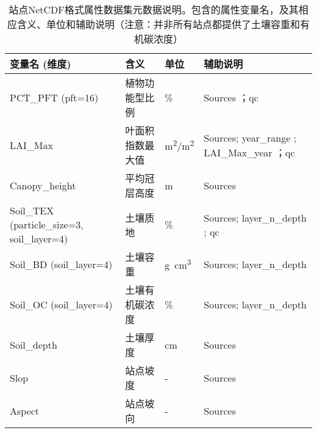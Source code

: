 \begin{table}[htbp]
  \begin{threeparttable}
    \centering
    \caption[站点NetCDF格式属性数据集元数据说明]{站点NetCDF格式属性数据集元数据说明。包含的属性变量名，及其相应含义、单位和辅助说明（注意：并非所有站点都提供了土壤容重和有机碳浓度）}
    \label{tab:站点数据元数据}
    \begin{tabular}{p{9.75em}p{10.25em}p{3.5em}p{9.5em}}
      \toprule
      \textbf{变量名 (维度)}                               & \textbf{含义}             & \textbf{单位}  & \textbf{辅助说明}                                            \\
      \midrule
      PCT\_PFT (pft=16)                                    & 植物功能型比例            & \%             & Sources\tnote{a} ；qc                                        \\
      LAI\_Max                                             & 叶面积指数最大值          & \unit{m^2/m^2} & Sources; year\_range\tnote{b} ; LAI\_Max\_year\tnote{c} ；qc \\
      Canopy\_height                                       & 平均冠层高度              & m              & Sources                                                      \\
      Soil\_TEX \newline (particle\_size=3, soil\_layer=4) & 土壤质地                  & \%             & Sources; layer\_n\_depth\tnote{d} ; qc                       \\
      Soil\_BD (soil\_layer=4)                             & 土壤容重                  & \unit{g.cm^3}  & Sources; layer\_n\_depth                                     \\
      Soil\_OC (soil\_layer=4)                             & 土壤有机碳浓度            & \%             & Sources; layer\_n\_depth                                     \\
      Soil\_depth                                          & 土壤厚度                  & cm             & Sources                                                      \\
      Slop                                                 & 站点坡度                  & -              & Sources                                                      \\
      Aspect                                               & 站点坡向                  & -              & Sources                                                      \\

\end{tabular}
\end{threeparttable}
\end{table}
